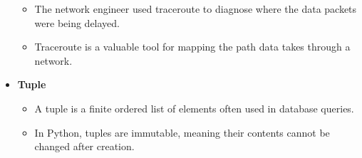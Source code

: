 \begin{itemize}
        \begin{itemize}
            \item The network engineer used traceroute to diagnose where the data packets were being delayed.
            \item Traceroute is a valuable tool for mapping the path data takes through a network.
        \end{itemize}
        \item \textbf{Tuple}
        \begin{itemize}
            \item A tuple is a finite ordered list of elements often used in database queries.
            \item In Python, tuples are immutable, meaning their contents cannot be changed after creation.
        \end{itemize}
    \end{itemize}
